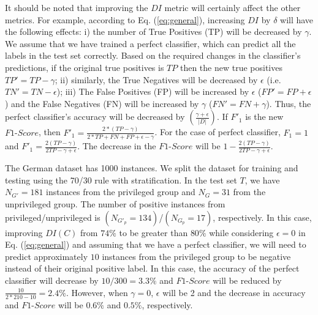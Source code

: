 It should be noted that improving the $DI$ metric will certainly affect the other metrics. For example, according to Eq. (\ref{eq:general}), increasing $DI$ by $\delta$ will have the following effects: i) the number of True Positives (TP) will be decreased by $\gamma$. We assume that we have trained a perfect classifier, which can predict all the labels in the test set correctly. Based on the required changes in the classifier's predictions, if the original true positives is $TP$ then the new true positives $TP'= TP - \gamma$; ii) similarly, the True Negatives will be decreased by $\epsilon$ (i.e. $TN'= TN -\epsilon$); iii) The False Positives (FP) will be increased by $\epsilon$ ($FP'= FP + \epsilon$) and the False Negatives (FN) will be increased by $\gamma$ ($FN'= FN + \gamma$). Thus, the perfect classifier's accuracy will be decreased by $\left(\frac{\gamma+\epsilon}{|D|}\right)$. If $F'_1$ is the new $F1\text{-}Score$, then $F'_1 = \frac{2*(TP-\gamma)}{2*TP+FN+FP+\epsilon-\gamma}$. For the case of perfect classifier, $F_1 = 1$ and $F'_1 = \frac{2(TP-\gamma)}{2TP -\gamma+\epsilon}$. The decrease in the $F1\text{-}Score$ will be $1 - \frac{2(TP-\gamma)}{2TP -\gamma+\epsilon}$.

\begin{example}
\noindent The German dataset \cite{UCIdfs} has 1000 instances. We split the dataset for training and testing using the 70/30 rule with stratification. In the test set $T$, we have $N_{G'} = 181$ instances from the privileged group and $N_G = 31$ from the unprivileged group. The number of positive instances from privileged/unprivileged is $(N_{G'_p} = 134)$/$(N_{G_p} = 17)$, respectively. In this case, improving $DI(C)$ from $74\%$ to be greater than $80\%$ while considering $\epsilon = 0$ in Eq. (\ref{eq:general}) and assuming that we have a perfect classifier, we will need to predict approximately $10$ instances from the privileged group to be negative instead of their original positive label. In this case, the accuracy of the perfect classifier will decrease by $10/300 = 3.3\%$ and $F1\text{-}Score$ will be reduced by $\frac{10}{2*210-10}= 2.4\%$. However, when $\gamma = 0$, $\epsilon$ will be 2 and the decrease in accuracy and $F1\text{-}Score$ will be $0.6\%$ and $0.5\%$, respectively.
\end{example}

